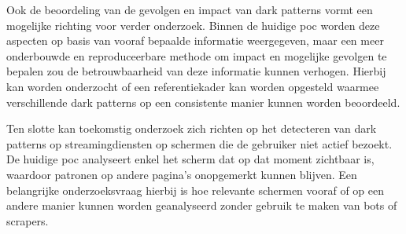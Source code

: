 \vspace{1em}

Ook de beoordeling van de gevolgen en impact van dark patterns vormt een mogelijke richting voor verder onderzoek. Binnen de huidige \acrshort{poc} worden deze aspecten op basis van vooraf bepaalde informatie weergegeven, maar een meer onderbouwde en reproduceerbare methode om impact en mogelijke gevolgen te bepalen zou de betrouwbaarheid van deze informatie kunnen verhogen. Hierbij kan worden onderzocht of een referentiekader kan worden opgesteld waarmee verschillende dark patterns op een consistente manier kunnen worden beoordeeld.

\vspace{1em}

Ten slotte kan toekomstig onderzoek zich richten op het detecteren van dark patterns op streamingdiensten op schermen die de gebruiker niet actief bezoekt. De huidige \acrshort{poc} analyseert enkel het scherm dat op dat moment zichtbaar is, waardoor patronen op andere pagina's onopgemerkt kunnen blijven. Een belangrijke onderzoeksvraag hierbij is hoe relevante schermen vooraf of op een andere manier kunnen worden geanalyseerd zonder gebruik te maken van bots of scrapers.